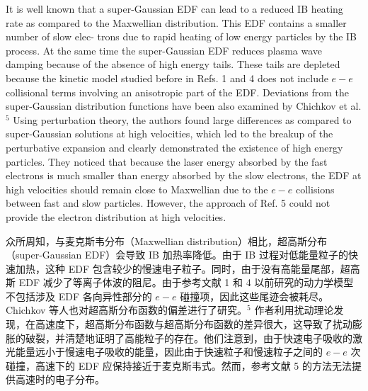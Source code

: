 \documentclass[oneside,onecolumn]{article}
\newcommand\enzhbox[2]{
  	\quad\par \begin{paracol}{2} \colseprulecolor{black} 
  			\begin{spacing}{1.0}
  				\footnotesize  #1
  			\end{spacing}
  		\switchcolumn[1] 
  		#2
  	\end{paracol} 
  }
\begin{document}
\begin{sloppypar}
 
\enzhbox{   It is well known that a super-Gaussian EDF can lead to a reduced IB heating rate as compared to the Maxwellian distribution. This EDF contains a smaller number of slow elec- trons due to rapid heating of low energy particles by the IB process. At the same time the super-Gaussian EDF reduces plasma wave damping because of the absence of high energy tails. These tails are depleted because the kinetic model studied before in Refs. 1 and 4 does not include $e-e$ collisional terms involving an anisotropic part of the EDF. Deviations from the super-Gaussian distribution functions have been also examined by Chichkov et al. ${ }^{5}$ Using perturbation theory, the authors found large differences as compared to super-Gaussian solutions at high velocities, which led to the breakup of the perturbative expansion and clearly demonstrated the existence of high energy particles. They noticed that because the laser energy absorbed by the fast electrons is much smaller than energy absorbed by the slow electrons, the EDF at high velocities should remain close to Maxwellian due to the $e-e$ collisions between fast and slow particles. However, the approach of Ref. 5 could not provide the electron distribution at high velocities.
}{
众所周知，与麦克斯韦分布（Maxwellian distribution）相比，超高斯分布（super-Gaussian EDF）会导致 IB 加热率降低。由于 IB 过程对低能量粒子的快速加热，这种 EDF 包含较少的慢速电子粒子。同时，由于没有高能量尾部，超高斯 EDF 减少了等离子体波的阻尼。由于参考文献 1 和 4 以前研究的动力学模型不包括涉及 EDF 各向异性部分的 $e-e$ 碰撞项，因此这些尾迹会被耗尽。Chichkov 等人也对超高斯分布函数的偏差进行了研究。${ }^{5}$ 作者利用扰动理论发现，在高速度下，超高斯分布函数与超高斯分布函数的差异很大，这导致了扰动膨胀的破裂，并清楚地证明了高能粒子的存在。他们注意到，由于快速电子吸收的激光能量远小于慢速电子吸收的能量，因此由于快速粒子和慢速粒子之间的 $e-e$ 次碰撞，高速下的 EDF 应保持接近于麦克斯韦式。然而，参考文献 5 的方法无法提供高速时的电子分布。

}
  

\end{sloppypar}
\end{document}
